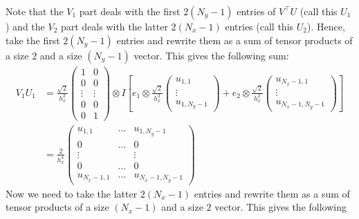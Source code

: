 \documentclass[reqno]{article}
\begin{document}
	Note that the $V_1$ part deals with the first $2(N_y - 1)$ entries of $V^\top U$ (call this $U_1$) and the $V_2$ part deals with the latter $2(N_x - 1)$ entries (call this $U_2$). Hence, take the first $2(N_y - 1)$ entries and rewrite them as a sum of tensor products of a size $2$ and a size $(N_y - 1)$ vector. This gives the following sum:
	\begin{equation}
	\begin{split}
		V_1 U_1 &=
		\frac{\sqrt{2}}{h_x^2} 
		\begin{pmatrix}
			1 &0 \\
			0 &0 \\
			\vdots &\vdots \\
			0 &0 \\
			0 &1
		\end{pmatrix}
		\otimes I
		\left[
		e_1 \otimes \frac{\sqrt{2}}{h_x^2}
		\begin{pmatrix}
			u_{1, 1} \\
			\vdots \\
			u_{1, N_y - 1}
		\end{pmatrix}
		+ e_2 \otimes \frac{\sqrt{2}}{h_x^2}
		\begin{pmatrix}
			u_{N_x - 1, 1}\\
			\vdots \\
			u_{N_x - 1, N_y - 1}
		\end{pmatrix}
		\right] \\
		&= \frac{2}{h_x^4} 
		\begin{pmatrix}
			u_{1, 1} &\ldots &u_{1, N_y - 1} \\
			0 &\ldots &0 \\
			\vdots & &\vdots \\
			0 &\ldots &0 \\
			u_{N_x - 1, 1} &\ldots &u_{N_x - 1, N_y - 1}
		\end{pmatrix}
	\end{split}
	\end{equation}
	Now we need to take the latter $2(N_x - 1)$ entries and rewrite them as a sum of tensor products of a size $(N_x - 1)$ and a size $2$ vector. This gives the following
\end{document}
